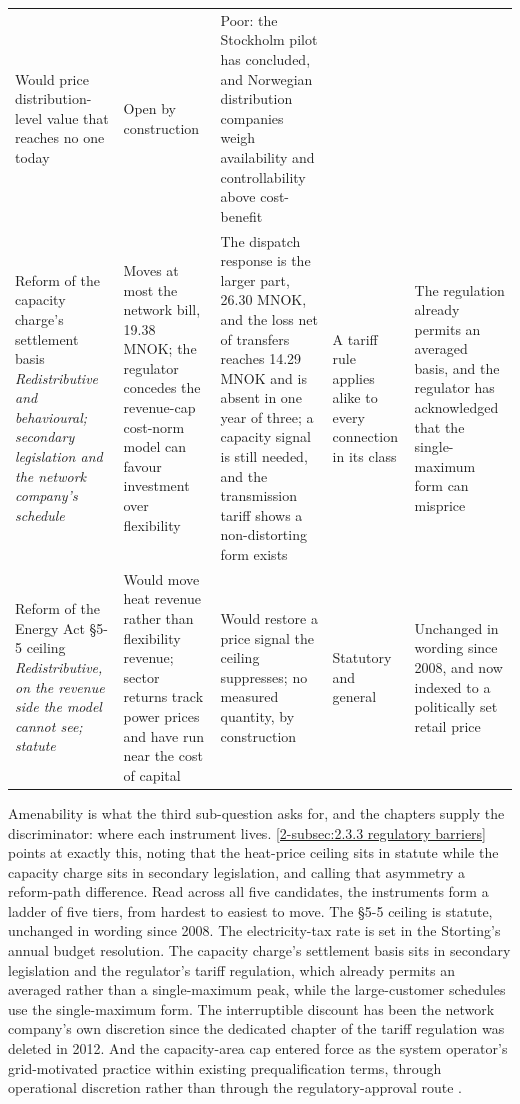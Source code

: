 \begin{table}[htbp]
\begin{tabular}{>{\raggedright}p{3.4cm}
                >{\raggedright}p{3.0cm}
                >{\raggedright}p{3.4cm}
                >{\raggedright}p{2.7cm}
                >{\raggedright\arraybackslash}p{3.0cm}}
Would price distribution-level value that reaches no one today &
Open by construction &
Poor: the Stockholm pilot has concluded, and Norwegian distribution companies weigh availability and controllability above cost-benefit \\[4pt]
Reform of the capacity charge's settlement basis \newline \emph{Redistributive and behavioural; secondary legislation and the network company's schedule} &
Moves at most the network bill, 19.38 MNOK; the regulator concedes the revenue-cap cost-norm model can favour investment over flexibility &
The dispatch response is the larger part, 26.30 MNOK, and the loss net of transfers reaches 14.29 MNOK and is absent in one year of three; a capacity signal is still needed, and the transmission tariff shows a non-distorting form exists &
A tariff rule applies alike to every connection in its class &
The regulation already permits an averaged basis, and the regulator has acknowledged that the single-maximum form can misprice \\[4pt]
Reform of the Energy Act \S5-5 ceiling \newline \emph{Redistributive, on the revenue side the model cannot see; statute} &
Would move heat revenue rather than flexibility revenue; sector returns track power prices and have run near the cost of capital &
Would restore a price signal the ceiling suppresses; no measured quantity, by construction &
Statutory and general &
Unchanged in wording since 2008, and now indexed to a politically set retail price \\
\bottomrule
\end{tabular}
\label{tab:5.3 mechanisms}
\end{table}

Amenability is what the third sub-question asks for, and the chapters supply the discriminator: where each instrument lives. \autoref{2-subsec:2.3.3 regulatory barriers} points at exactly this, noting that the heat-price ceiling sits in statute while the capacity charge sits in secondary legislation, and calling that asymmetry a reform-path difference. Read across all five candidates, the instruments form a ladder of five tiers, from hardest to easiest to move. The \S5-5 ceiling is statute, unchanged in wording since 2008. The electricity-tax rate is set in the Storting's annual budget resolution. The capacity charge's settlement basis sits in secondary legislation and the regulator's tariff regulation, which already permits an averaged rather than a single-maximum peak, while the large-customer schedules use the single-maximum form. The interruptible discount has been the network company's own discretion since the dedicated chapter of the tariff regulation was deleted in 2012. And the capacity-area cap entered force as the system operator's grid-motivated practice within existing prequalification terms, through operational discretion rather than through the regulatory-approval route \cite{statnett_sporsmal_2026}.

